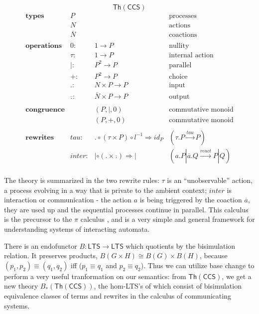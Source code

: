 \documentclass{amsart}
\theoremstyle{definition}
\newcommand{\Th}{\mathsf{Th}}
\newcommand{\maps}{\colon}
\begin{document}
\[\Th(\mathsf{CCS})\]
\[\begin{array}{lrll}
    \textbf{types} & P && \text{processes}\\
                   & N && \text{actions}\\
                   & \overline{N} && \text{coactions}\\\\
    \textbf{operations} & 0\maps & 1\to P & \text{nullity}\\
                   & \tau\maps & 1\to P & \text{internal action}\\
                   & |\maps & P^2\to P & \text{parallel}\\
                   & +\maps & P^2\to P &\text{choice}\\
                   & .\maps & N\times P\to P & \text{input}\\
                   & \overline{.}\maps & \overline{N}\times P\to P & \text{output}\\\\
    \textbf{congruence} && (P,|,0) & \text{commutative monoid}\\
                   && (P,+,0) & \text{commutative monoid}\\\\
    \textbf{rewrites} & tau\maps & .\circ (\tau\times P)\circ l^{-1} \Rightarrow id_P & (\tau.P \xrightarrow{tau} P)\\
                   & inter \maps & |\circ (.\times \overline{.}) \Rightarrow | & (a.P|\overline{a}.Q \xrightarrow{react} P|Q)\\
  \end{array}\]

The theory is summarized in the two rewrite rules: $\tau$ is an ``unobservable'' action, a process evolving in a way that is private to the ambient context; $inter$ is interaction or communication - the action $a$ is being triggered by the coaction $\overline{a}$, they are used up and the sequential processes continue in parallel. This calculus is the precursor to the $\pi$ calculus \cite{milner}, and is a very simple and general framework for understanding systems of interacting automata.

There is an endofunctor $B\maps \mathsf{LTS} \to \mathsf{LTS}$ which quotients by the bisimulation relation. It preserves products, $B(G\times H)\cong B(G)\times B(H)$, because $(p_1,p_2)\equiv(q_1,q_2)$ iff ($p_1\equiv q_1$ and $p_2\equiv q_2$). Thus we can utilize base change to perform a very useful tranformation  on our semantics: from $\Th(\mathsf{CCS})$, we get a new theory $B_*(\Th(\mathsf{CCS}))$, the hom-LTS's of which consist of bisimulation equivalence classes of terms and rewrites in the calculus of communicating systems.
\end{document}
